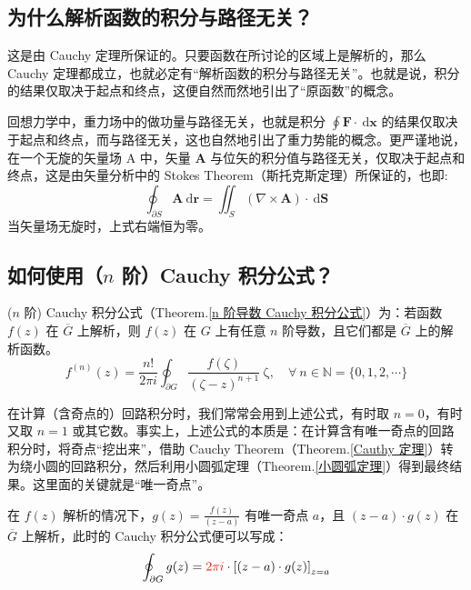 \documentclass[UTF8]{report}
\def\N{\mathbb{N}}
\theoremstyle{MyLineTheoremStyle} %
\theoremstyle{MyBlockTheoremStyle} %
\theoremstyle{MySubsubsectionStyle} %
\begin{document}
\subsection{为什么解析函数的积分与路径无关？}

这是由 Cauchy 定理所保证的。只要函数在所讨论的区域上是解析的，那么 Cauchy 定理都成立，也就必定有“解析函数的积分与路径无关”。也就是说，积分的结果仅取决于起点和终点，这便自然而然地引出了“原函数”的概念。

回想力学中，重力场中的做功量与路径无关，也就是积分 $\oint \boldsymbol{F}\cdot \ \mathrm{d}\boldsymbol{x}$ 的结果仅取决于起点和终点，而与路径无关，这也自然地引出了重力势能的概念。更严谨地说，在一个无旋的矢量场 A 中，矢量 $\boldsymbol{A}$ 与位矢的积分值与路径无关，仅取决于起点和终点，这是由矢量分析中的 Stokes Theorem（斯托克斯定理）所保证的，也即: 
\begin{equation}
\oint_{\partial S} \boldsymbol{A} \ \mathrm{d}\boldsymbol{r} = \iint_S (\nabla \times \boldsymbol{A}) \cdot \ \mathrm{d}\boldsymbol{S}
\end{equation}
当矢量场无旋时，上式右端恒为零。

\subsection{如何使用（$n$ 阶）Cauchy 积分公式？}

($n$ 阶) Cauchy 积分公式（Theorem.\ref{n 阶导数 Cauchy 积分公式}）为：若函数 $f(z)$ 在 $\overline{G}$ 上解析，则 $f(z)$ 在 $G$ 上有任意 $n$ 阶导数，且它们都是 $\overline{G}$ 上的解析函数。
\begin{equation}
f^{(n)}(z) = \frac{n !}{2\pi i} \oint_{\partial G} \frac{f(\zeta)}{(\zeta - z )^{n+1}} \ \mathrm{\zeta},\quad \forall\ n \in \N = \{0, 1, 2, \cdots\}
\end{equation}

在计算（含奇点的）回路积分时，我们常常会用到上述公式，有时取 $n = 0$，有时又取 $n =1$ 或其它数。事实上，上述公式的本质是：在计算含有唯一奇点的回路积分时，将奇点“挖出来”，借助 Cauchy Theorem（Theorem.\ref{Cauthy 定理}）转为绕小圆的回路积分，然后利用小圆弧定理（Theorem.\ref{小圆弧定理}）得到最终结果。这里面的关键就是“唯一奇点”。

在 $f(z)$ 解析的情况下，$g(z) = \frac{f(z)}{(z - a)}$ 有唯一奇点 $a$，且 $(z - a)\cdot g(z) $ 在 $\overline{G}$ 上解析，此时的 Cauchy 积分公式便可以写成：
\begin{equation}
\oint_{\partial G} g(z) = {\color{red} 2\pi i }\cdot \left[ (z - a)\cdot g(z) \right]_{z = a}
\end{equation}
\end{document}
